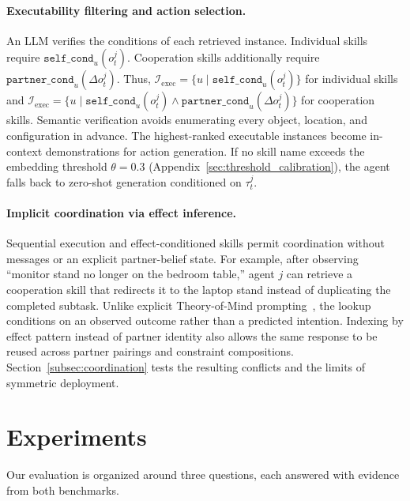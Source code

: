 \documentclass{article}
\theoremstyle{plain}
\theoremstyle{definition}
\theoremstyle{remark}
\begin{document}
 
\paragraph{Executability filtering and action selection.}
An LLM verifies the conditions of each retrieved instance. Individual skills require $\texttt{self\_cond}_u(o_t^j)$. Cooperation skills additionally require $\texttt{partner\_cond}_u(\Delta o_t^j)$. Thus,
$\mathcal{I}_{\text{exec}}=\{u\mid\texttt{self\_cond}_u(o_t^j)\}$ for individual skills and
$\mathcal{I}_{\text{exec}}=\{u\mid\texttt{self\_cond}_u(o_t^j)\land\texttt{partner\_cond}_u(\Delta o_t^j)\}$ for cooperation skills. Semantic verification avoids enumerating every object, location, and configuration in advance. The highest-ranked executable instances become in-context demonstrations for action generation. If no skill name exceeds the embedding threshold $\theta=0.3$ (Appendix~\ref{sec:threshold_calibration}), the agent falls back to zero-shot generation conditioned on $\tau_t^j$.
 
\paragraph{Implicit coordination via effect inference.}
Sequential execution and effect-conditioned skills permit coordination without messages or an explicit partner-belief state. For example, after observing ``monitor stand no longer on the bedroom table,'' agent $j$ can retrieve a cooperation skill that redirects it to the laptop stand instead of duplicating the completed subtask. Unlike explicit Theory-of-Mind prompting~\citep{kosinski2023theory}, the lookup conditions on an observed outcome rather than a predicted intention. Indexing by effect pattern instead of partner identity also allows the same response to be reused across partner pairings and constraint compositions. Section~\ref{subsec:coordination} tests the resulting conflicts and the limits of symmetric deployment.
 
 
\section{Experiments}
\label{sec:experiments}
Our evaluation is organized around three questions, each answered with evidence from both benchmarks.
 
\end{document}
